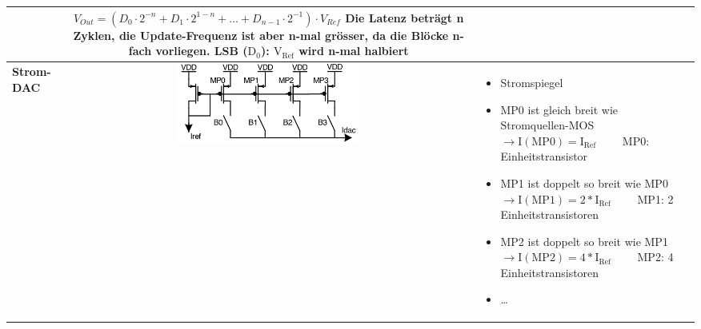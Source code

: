 \begin{longtable}{|>{\bfseries}p{4cm}|c|p{8cm}|}
	& $V_{Out} = (D_0 \cdot 2^{-n} + D_1 \cdot 2^{1-n} + ... + D_{n-1} \cdot 2^{-1})\cdot V_{Ref}$\newline\newline
      Die Latenz beträgt n Zyklen, die Update-Frequenz ist aber n-mal grösser, da die Blöcke n-fach vorliegen.\newline
      LSB ($\mathrm{D_0}$): $\mathrm{V_{Ref}}$ wird n-mal halbiert
	\\ \hline
	Strom-DAC
	& \includegraphics[width=6cm, valign=t]{pictures/stromDAC}
	& \begin{itemize}
  		\item Stromspiegel
  		\item MP0 ist gleich breit wie Stromquellen-MOS $\to \mathrm{I(MP0)=I_{Ref}} \qquad$ MP0: Einheitstransistor
  		\item MP1 ist doppelt so breit wie MP0 $\to \mathrm{I(MP1)}=2*\mathrm{I_{Ref}} \qquad$ MP1: 2 Einheitstransistoren
  		\item MP2 ist doppelt so breit wie MP1 $\to \mathrm{I(MP2)}=4*\mathrm{I_{Ref}} \qquad$ MP2: 4 Einheitstransistoren
  		\item \ldots
	  \end{itemize}
	\\ \hline
\end{longtable}

